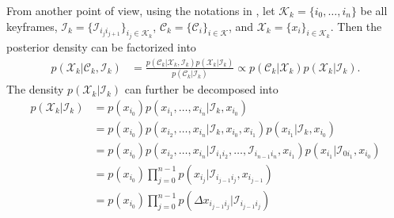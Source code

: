 \documentclass[10pt]{article}
\begin{document}
From another point of view, using the notations in \cite{forster2016manifold}, let $\mathcal{K}_k = \{i_0,\ldots,i_n\}$ be all keyframes, $\mathcal{I}_k = \{\mathcal{I}_{i_j i_{j+1}}\}_{i_j\in\mathcal{K}_k}$, $\mathcal{C}_k = \{\mathcal{C}_i\}_{i\in\mathcal{K}}$, and $\mathcal{X}_k = \{x_i\}_{i\in\mathcal{K}_k}$.
Then the posterior density can be factorized into
\begin{align}
	p(\mathcal{X}_k | \mathcal{C}_k, \mathcal{I}_k) &= \frac{p(\mathcal{C}_k | \mathcal{X}_k, \mathcal{I}_k) p(\mathcal{X}_k | \mathcal{I}_k)}{p(\mathcal{C}_k | \mathcal{I}_k)} \propto p(\mathcal{C}_k | \mathcal{X}_k) p(\mathcal{X}_k | \mathcal{I}_k).
\end{align}
The density $p(\mathcal{X}_k | \mathcal{I}_k)$ can further be decomposed into
\begin{align}
	p(\mathcal{X}_k | \mathcal{I}_k) &= p(x_{i_0}) p(x_{i_1},\ldots,x_{i_n} | \mathcal{I}_k, x_{i_0}) \nonumber \\
	&= p(x_{i_0}) p(x_{i_2},\ldots,x_{i_n} | \mathcal{I}_k, x_{i_0}, x_{i_1}) p(x_{i_1} | \mathcal{I}_k, x_{i_0}) \nonumber \\
	&= p(x_{i_0}) p(x_{i_2},\ldots,x_{i_n} | \mathcal{I}_{i_1i_2}, \ldots, \mathcal{I}_{i_{n-1}i_n}, x_{i_1}) p(x_{i_1} | \mathcal{I}_{0i_1}, x_{i_0}) \nonumber \\
	&= p(x_{i_0}) \prod_{j=0}^{n-1} p(x_{i_j} | \mathcal{I}_{i_{j-1}i_j}, x_{i_{j-1}}) \nonumber \\
	&= p(x_{i_0}) \prod_{j=0}^{n-1} p(\Delta x_{i_{j-1}i_j} | \mathcal{I}_{i_{j-1}i_j})
\end{align}



\end{document}
